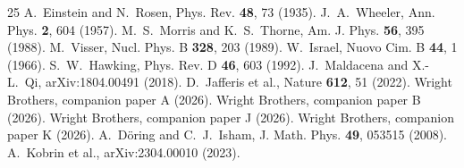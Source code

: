 \documentclass[11pt,a4paper]{article}
\begin{document}
\begin{thebibliography}{25}
 A.~Einstein and N.~Rosen, Phys. Rev. \textbf{48}, 73 (1935).
 J.~A.~Wheeler, Ann. Phys. \textbf{2}, 604 (1957).
 M.~S.~Morris and K.~S.~Thorne, Am. J. Phys. \textbf{56}, 395 (1988).
 M.~Visser, Nucl. Phys. B \textbf{328}, 203 (1989).
 W.~Israel, Nuovo Cim. B \textbf{44}, 1 (1966).
 S.~W.~Hawking, Phys. Rev. D \textbf{46}, 603 (1992).
 J.~Maldacena and X.-L.~Qi, arXiv:1804.00491 (2018).
 D.~Jafferis et al., Nature \textbf{612}, 51 (2022).
 Wright Brothers, companion paper A (2026).
 Wright Brothers, companion paper B (2026).
 Wright Brothers, companion paper J (2026).
 Wright Brothers, companion paper K (2026).
 A.~D\"oring and C.~J.~Isham, J. Math. Phys. \textbf{49}, 053515 (2008).
 A.~Kobrin et al., arXiv:2304.00010 (2023).
\end{thebibliography}
\end{document}
